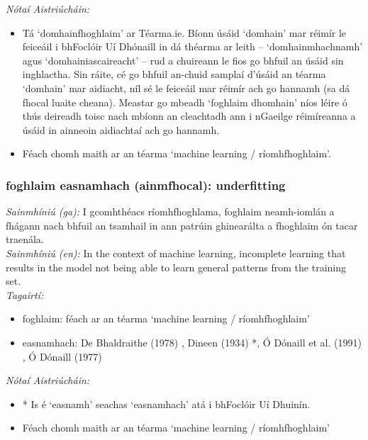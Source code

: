  \noindent \textit{Nótaí Aistriúcháin:}
\begin{itemize}
	\item Tá `domhainfhoghlaim' ar Téarma.ie. Bíonn úsáid `domhain' mar réimír le feiceáil i bhFoclóir Uí Dhónaill in dá théarma ar leith -- `domhainmhachnamh' agus `domhainiascaireacht' -- rud a chuireann le fios go bhfuil an úsáid sin inghlactha. Sin ráite, cé go bhfuil an-chuid samplaí d'úsáid an téarma `domhain' mar aidiacht, níl sé le feiceáil mar réimír ach go hannamh (sa dá fhocal luaite cheana). Meastar go mbeadh `foghlaim dhomhain' níos léire ó thús deireadh toisc nach mbíonn an cleachtadh ann i nGaeilge réimíreanna a úsáid in ainneoin aidiachtaí ach go hannamh.
	\item Féach chomh maith ar an téarma `machine learning / ríomhfhoghlaim'.
\end{itemize}


\subsubsection*{foghlaim easnamhach (ainmfhocal): underfitting}
 \noindent \textit{Sainmhíniú (ga):} I gcomhthéacs ríomhfhoghlama, foghlaim neamh-iomlán a fhágann nach bhfuil an tsamhail in ann patrúin ghinearálta a fhoghlaim ón tacar traenála.
\\
 \noindent \textit{Sainmhíniú (en):} In the context of machine learning, incomplete learning that results in the model not being able to learn general patterns from the training set.
\\
 \noindent \textit{Tagairtí:}
\begin{itemize}
	\item foghlaim: féach ar an téarma `machine learning / ríomhfhoghlaim'
	\item easnamhach: De Bhaldraithe (1978) \cite{de-bhaldraithe}, Dineen (1934) \cite{dineen}*, Ó Dónaill et al. (1991) \cite{focloir-beag}, Ó Dónaill (1977) \cite{odonaill}
\end{itemize}

 \noindent \textit{Nótaí Aistriúcháin:}
\begin{itemize}
	\item * Is é `easnamh' seachas `easnamhach' atá i bhFoclóir Uí Dhuinín.
	\item Féach chomh maith ar an téarma `machine learning / ríomhfhoghlaim'
\end{itemize}


